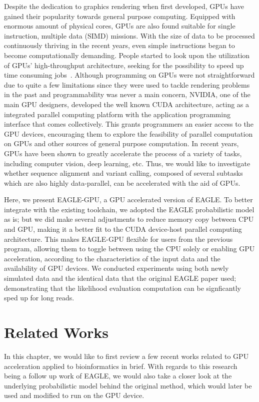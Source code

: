 \documentclass{PHlab-thesis}
\begin{document}
Despite the dedication to graphics rendering when first developed, GPUs have gained their popularity towards general purpose computing. Equipped with enormous amount of physical cores, GPUs are also found suitable for single instruction, multiple data (SIMD) missions. With the size of data to be processed continuously thriving in the recent years, even simple instructions began to become computationally demanding. People started to look upon the utilization of GPUs' high-throughput architecture, seeking for the possibility to speed up time consuming jobs~\cite{owens2008gpu,nickolls2010gpu}. Although programming on GPUs were not straightforward due to quite a few limitations since they were used to tackle rendering problems in the past and programmability was never a main concern, NVIDIA, one of the main GPU designers, developed the well known CUDA architecture, acting as a integrated parallel computing platform with the application programming interface that comes collectively. This grants programmers an easier access to the GPU devices, encouraging them to explore the feasibility of parallel computation on GPUs and other sources of general purpose computation. In recent years, GPUs have been shown to greatly accelerate the process of a variety of tasks, including computer vision, deep learning, etc. Thus, we would like to investigate whether sequence alignment and variant calling, composed of several subtasks which are also highly data-parallel, can be accelerated with the aid of GPUs.

Here, we present EAGLE-GPU, a GPU accelerated version of EAGLE.  To better integrate with the existing toolchain, we adopted the EAGLE probabilistic model as is; but we did make several adjustments to reduce memory copy between CPU and GPU, making it a better fit to the CUDA device-host parallel computing architecture.  This makes EAGLE-GPU flexible for users from the previous program, allowing them to toggle between using the CPU solely or enabling GPU acceleration, according to the characteristics of the input data and the availability of GPU devices.  We conducted experiments using both newly simulated data and the identical data that the original EAGLE paper used; demonstrating that the likelihood evaluation computation can be signficantly sped up for long reads.

\chapter{Related Works}
In this chapter, we would like to first review a few recent works related to GPU acceleration applied to bioinformatics in brief. With regards to this research being a follow up work of EAGLE, we would also take a closer look at the underlying probabilistic model behind the original method, which would later be used and modified to run on the GPU device.
\end{document}
